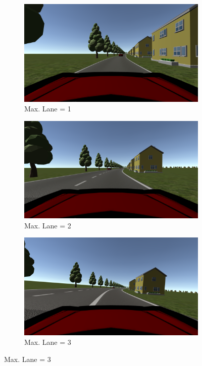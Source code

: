 \begin{figure}[H]
  \centering
	\begin{subfigure}[b]{0.6\linewidth}
		\centering
    \includegraphics[width=\textwidth]{images/Chapter3/lane1.jpg}
    \caption{Max. Lane = 1}
	\end{subfigure}\hfill
  
  \begin{subfigure}[b]{0.6\linewidth}
		\centering
    \includegraphics[width=\textwidth]{images/Chapter3/lane2.jpg}
    \caption{Max. Lane = 2}
	\end{subfigure}\hfill
  
  \begin{subfigure}[b]{0.6\linewidth}
		\centering
    \includegraphics[width=\textwidth]{images/Chapter3/lane3.jpg}
    \caption{Max. Lane = 3}
	\end{subfigure}\hfill
 

\end{figure}
